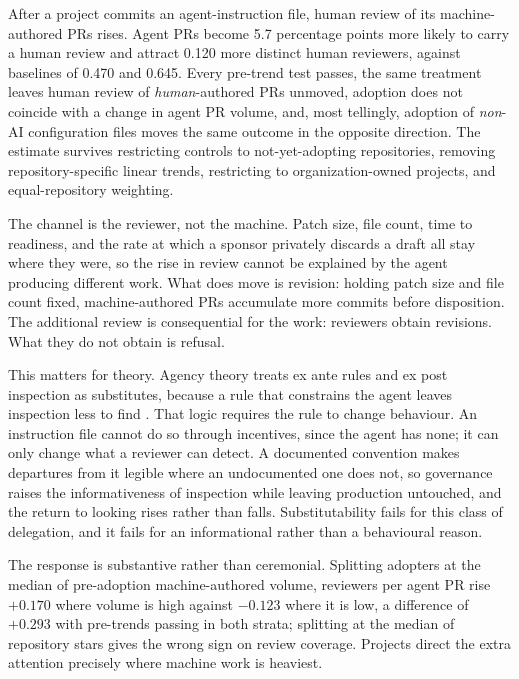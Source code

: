 \documentclass[mnsc]{informs4}
\begin{document}
After a project commits an agent-instruction file, human review of its
machine-authored PRs rises. Agent PRs become 5.7 percentage points more likely to
carry a human review and attract 0.120 more distinct human reviewers, against
baselines of 0.470 and 0.645. Every pre-trend test passes, the same treatment
leaves human review of \emph{human}-authored PRs unmoved, adoption does not
coincide with a change in agent PR volume, and, most tellingly, adoption of
\emph{non}-AI configuration files moves the same outcome in the opposite
direction. The estimate survives restricting controls to not-yet-adopting
repositories, removing repository-specific linear trends, restricting to
organization-owned projects, and equal-repository weighting.

The channel is the reviewer, not the machine. Patch size, file count, time to
readiness, and the rate at which a sponsor privately discards a draft all stay
where they were, so the rise in review cannot be explained by the agent producing
different work. What does move is revision: holding patch size and file count
fixed, machine-authored PRs accumulate more commits before disposition. The
additional review is consequential for the work: reviewers obtain revisions.
What they do not obtain is refusal.

This matters for theory. Agency theory treats ex ante rules and ex post inspection
as substitutes, because a rule that constrains the agent leaves inspection less to
find \citep{eisenhardt1985control}. That logic requires the rule to change
behaviour. An instruction file cannot do so through incentives, since the agent has
none; it can only change what a reviewer can detect. A documented convention makes
departures from it legible where an undocumented one does not, so governance raises
the informativeness of inspection while leaving production untouched, and the
return to looking rises rather than falls. Substitutability fails for this class of
delegation, and it fails for an informational rather than a behavioural reason.

The response is substantive rather than ceremonial. Splitting adopters at the
median of pre-adoption machine-authored volume, reviewers per agent PR rise
$+0.170$ where volume is high against $-0.123$ where it is low, a difference of
$+0.293$ with pre-trends passing in both strata; splitting at the median of
repository stars gives the wrong sign on review coverage. Projects direct the extra
attention precisely where machine work is heaviest.
\end{document}
